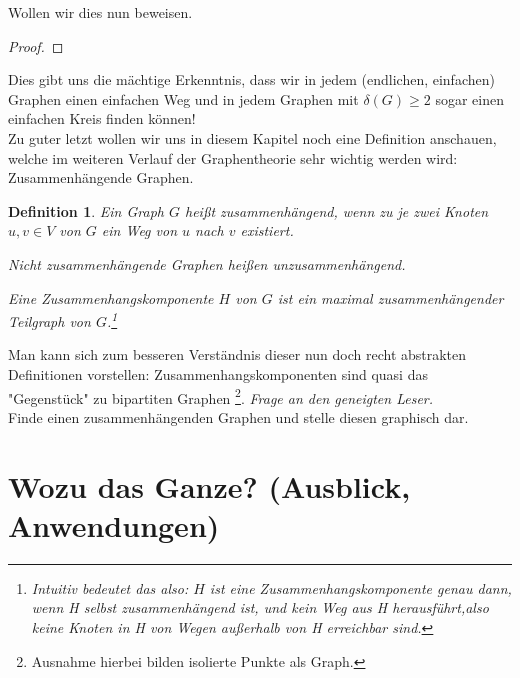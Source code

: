 \documentclass{article}
\newtheorem{definition}{Definition}
\begin{document}
Wollen wir dies nun beweisen.\\
\begin{proof}
\end{proof}
Dies gibt uns die mächtige Erkenntnis, dass wir in jedem (endlichen, einfachen) Graphen einen einfachen Weg und in jedem Graphen mit $\delta(G) \geq 2$ sogar einen einfachen Kreis finden können!\\
\bigskip
Zu guter letzt wollen wir uns in diesem Kapitel noch eine Definition anschauen, welche im weiteren Verlauf der Graphentheorie sehr wichtig werden wird: Zusammenhängende Graphen.\\
\begin{definition}
	Ein Graph $G$ heißt \emph{zusammenhängend}, wenn zu je zwei Knoten $u, v \in V$ von $G$ ein \emph{Weg} von $u$ nach $v$ existiert.
	\par\bigskip
	Nicht zusammenhängende Graphen heißen \emph{unzusammenhängend}.
	\par\bigskip
	Eine \emph{Zusammenhangskomponente} $H$ von $G$ ist ein \emph{maximal zusammenhängender Teilgraph} von $G$.\footnote[2]{Intuitiv bedeutet das also: $H$ ist eine Zusammenhangskomponente genau dann, wenn H selbst zusammenhängend ist, und \emph{kein Weg aus H herausführt},also keine Knoten in H von Wegen außerhalb von H erreichbar sind.}
\end{definition}
Man kann sich zum besseren Verständnis dieser nun doch recht abstrakten Definitionen vorstellen: Zusammenhangskomponenten sind quasi das "Gegenstück" zu bipartiten Graphen \footnote[3]{Ausnahme hierbei bilden isolierte Punkte als Graph.}.
\bigskip
\emph{Frage an den geneigten Leser.}\\
Finde einen zusammenhängenden Graphen und stelle diesen graphisch dar.\\

\newpage
\section[Wozu das Ganze?]{Wozu das Ganze? (Ausblick, Anwendungen)}
\end{document}
